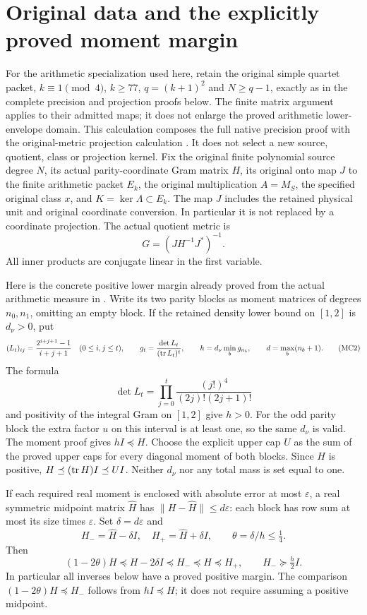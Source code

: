 \documentclass[11pt]{article}
\begin{document}
\section{Original data and the explicitly proved moment margin}
For the arithmetic specialization used here, retain the original simple
quartet packet, $k\equiv1\pmod4$, $k\ge77$, $q=(k+1)^2$ and
$N\ge q-1$, exactly as in the complete precision and projection
proofs below. The finite matrix argument applies to their admitted
maps; it does not enlarge the proved arithmetic lower-envelope domain.
This calculation composes the full native precision proof
\cite{mcomp:precision} with the original-metric projection calculation
\cite{mcomp:projection}. It does not select a new source, quotient, class or
projection kernel. Fix the original finite polynomial source degree $N$,
its actual parity-coordinate Gram matrix $H$, its original onto map
$J$ to the finite arithmetic packet $E_k$, the original multiplication
$A=M_S$, the specified original class $x$, and $K=\ker\Lambda\subset E_k$.
The map $J$ includes the retained physical unit and original coordinate
conversion. In particular it is not replaced by a coordinate projection.
The actual quotient metric is
\[
 G=(JH^{-1}J^*)^{-1}.                                      \tag{MC1}
\]
All inner products are conjugate linear in the first variable.

Here is the concrete positive lower margin already proved from the actual
arithmetic measure in \cite{mcomp:precision}. Write its two parity blocks as
moment matrices of degrees $n_0,n_1$, omitting an empty block. If the
retained density lower bound on $[1,2]$ is $d_\nu>0$, put
\[
 (L_t)_{ij}=\frac{2^{i+j+1}-1}{i+j+1}\quad(0\le i,j\le t),
 \qquad g_t=\frac{\det L_t}{(\operatorname{tr} L_t)^t},\qquad
 h=d_\nu\min_{b}g_{n_b},\qquad d=\max_b(n_b+1).              \tag{MC2}
\]
The formula
\[
 \det L_t=\prod_{j=0}^t\frac{(j!)^4}{(2j)!(2j+1)!}
\]
and positivity of the integral Gram on $[1,2]$ give $h>0$.
For the odd parity block the extra factor $u$ on this interval is at
least one, so the same $d_\nu$ is valid. The moment proof gives
$hI\preceq H$. Choose the explicit upper cap $U$ as the sum of
the proved upper caps for every diagonal moment of both blocks. Since
$H$ is positive, $H\preceq(\operatorname{tr} H)I\preceq UI$.
Neither $d_\nu$ nor any total mass is set equal to one.

If each required real moment is enclosed with absolute error at most
$\varepsilon$, a real symmetric midpoint matrix $\widehat H$ has
$\|H-\widehat H\|\le d\varepsilon$: each block has row sum at most
its size times $\varepsilon$. Set $\delta=d\varepsilon$ and
\[
 H_-=\widehat H-\delta I,\quad H_+=\widehat H+\delta I,
 \qquad \theta=\delta/h\le\tfrac14.
                                                               \tag{MC3}
\]
Then
\[
 (1-2\theta)H\preceq H-2\delta I\preceq H_-
 \preceq H\preceq H_+,
 \qquad H_-\succeq\tfrac h2 I.                                \tag{MC4}
\]
In particular all inverses below have a proved positive margin. The
comparison $(1-2\theta)H\preceq H_-$ follows from $hI\preceq H$;
it does not require assuming a positive midpoint.
\end{document}
